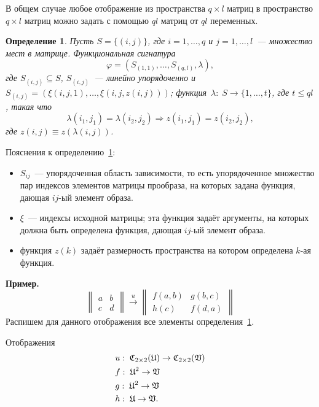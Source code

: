 \documentclass[a4paper, 12pt]{report}
\newtheorem{definition}{Определение}[chapter]
\begin{document}
В общем случае любое отображение из пространства $q\times l$ матриц в пространство $q\times l$ матриц можно задать с помощью $ql$ матриц от $ql$ переменных.

\begin{definition}
\label{def::sign}
Пусть $S = \{ (i, j) \}$, где $i = 1,\ldots, q$ и $j = 1,\ldots, l$~--- множество мест в матрице. Функциональная сигнатура
\[
\varphi = (S_{(1,1)}, \ldots, S_{(q, l)}, \lambda),
\]
где $S_{(i, j)} \subseteq S$, $S_{(i,j)}$~--- линейно упорядоченно и $S_{(i,j)} = (\xi(i, j, 1), \ldots, \xi(i, j, z(i, j)))$; функция~$\lambda: \;S \rightarrow \{1, \ldots, t\}$, где $t \leq ql$, такая что
\[
\lambda(i_1, j_1) = \lambda(i_2, j_2) \Rightarrow z(i_1, j_1) = z(i_2, j_2),
\]
где $z(i, j) \equiv z(\lambda(i, j))$.
\end{definition}
Пояснения к определению~\ref{def::sign}:
\begin{itemize}
\item $S_{ij}$~--- упорядоченная область зависимости, то есть упорядоченное множество пар индексов элементов матрицы прообраза, на которых задана функция, дающая $ij$-ый элемент образа.
\item $\xi$~--- индексы исходной матрицы; эта функция задаёт аргументы, на которых должна быть определена функция, дающая $ij$-ый элемент образа.
\item функция $z(k)$ задаёт размерность пространства на котором определена $k$-ая функция.
\end{itemize}
\textbf{Пример.}
\[
\begin{Vmatrix}
a & b\\
c & d
\end{Vmatrix}
\mathop{\longrightarrow}\limits^u
\begin{Vmatrix}
f(a, b) & g(b, c)\\
h(c) & f(d, a)
\end{Vmatrix}
\]
Распишем для данного отображения все элементы определения~\ref{def::sign}.

Отображения
\begin{equation*}
\begin{split}
& u:\; \mathfrak{C}_{2 \times 2}(\mathfrak{U}) \rightarrow \mathfrak{C}_{2 \times 2}(\mathfrak{V}) \\
& f: \; \mathfrak{U}^2 \rightarrow \mathfrak{V} \\
& g: \; \mathfrak{U}^2 \rightarrow \mathfrak{V} \\
& h: \; \mathfrak{U} \rightarrow \mathfrak{V}.
\end{split}
\end{equation*}
\end{document}
